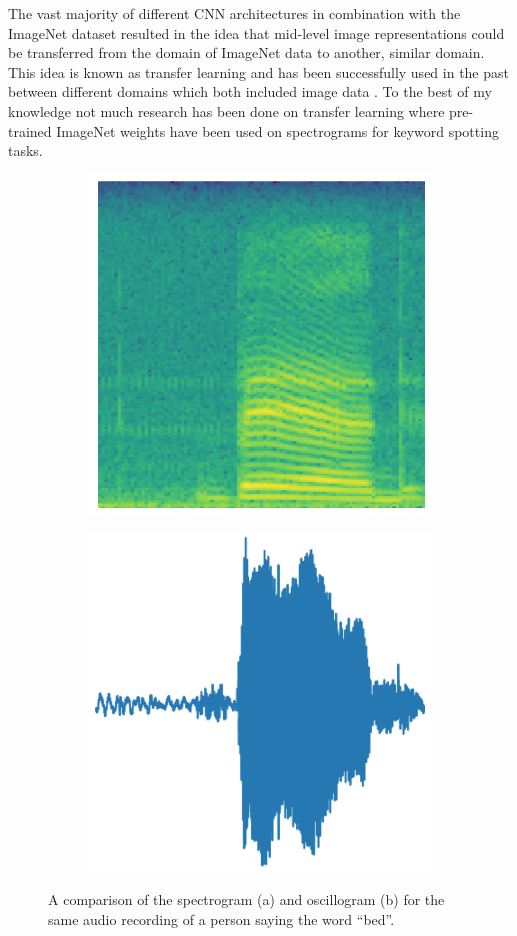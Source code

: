 \documentclass{article}
\theoremstyle{definition}
\theoremstyle{remark}
\begin{document}
The vast majority of different CNN architectures in combination with the ImageNet dataset resulted in the idea that mid-level image representations could be transferred from the domain of ImageNet data to another, similar domain. This idea is known as transfer learning and has been successfully used in the past between different domains which both included image data \cite{oquab2014learning}. To the best of my knowledge not much research has been done on transfer learning where pre-trained ImageNet weights have been used on spectrograms for keyword spotting tasks.\\



\begin{figure}
\centering
\begin{subfigure}{.5\textwidth}
  \centering
  \includegraphics[width=.5\linewidth]{img/papers/image_recognition/spectrogram.png}
  \caption{}
  \label{fig:sub1}
\end{subfigure}%
\begin{subfigure}{.5\textwidth}
  \centering
  \includegraphics[width=.5\linewidth]{img/papers/image_recognition/amplitude_vs_time.png}
  \caption{}
  \label{fig:sub2}
\end{subfigure}
\caption{A comparison of the spectrogram (a) and oscillogram (b) for the same audio recording of
a person saying the word “bed”.}
\label{fig:spectrogram_vs_time_plot}
\end{figure}
\end{document}
